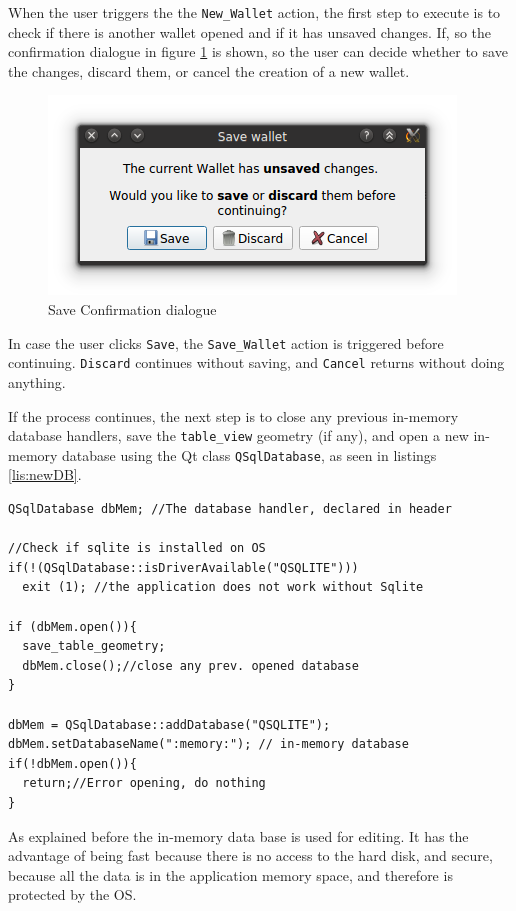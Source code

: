 When the user triggers the the \texttt{New\_Wallet} action, the first step to execute is to check if there is another wallet opened and if it has unsaved changes. If, so the confirmation dialogue in figure \ref{fig:confSave} is shown, so the user can decide whether to save the changes, discard them, or cancel the creation of a new wallet.
\begin{figure}[htb]
  \centering
  \captionsetup{justification=centering}
  \centerline{\includegraphics[width=0.6\columnwidth]{chapters/figures/development/confSave.png}}
  \caption{Save Confirmation dialogue}
  \label{fig:confSave}
\end{figure}

In case the user clicks \texttt{Save}, the \texttt{Save\_Wallet} action is triggered before continuing. \texttt{Discard} continues without saving, and \texttt{Cancel} returns without doing anything.

If the process continues, the next step is to close any previous in-memory database handlers, save the \texttt{table\_view} geometry (if any), and open a new in-memory database using the Qt class \texttt{QSqlDatabase}, as seen in listings \ref{lis:newDB}.

\begin{lstlisting}[style=customc, float=htb, caption={New in memory database}, label = {lis:newDB}]
QSqlDatabase dbMem; //The database handler, declared in header 

//Check if sqlite is installed on OS
if(!(QSqlDatabase::isDriverAvailable("QSQLITE")))
  exit (1); //the application does not work without Sqlite

if (dbMem.open()){ 
  save_table_geometry;
  dbMem.close();//close any prev. opened database
}

dbMem = QSqlDatabase::addDatabase("QSQLITE");
dbMem.setDatabaseName(":memory:"); // in-memory database
if(!dbMem.open()){
  return;//Error opening, do nothing
}
\end{lstlisting}

As explained before the in-memory data base is used for editing. It has the advantage of being fast because there is no access to the hard disk, and secure, because all the data is in the application memory space, and therefore is protected by the OS.

